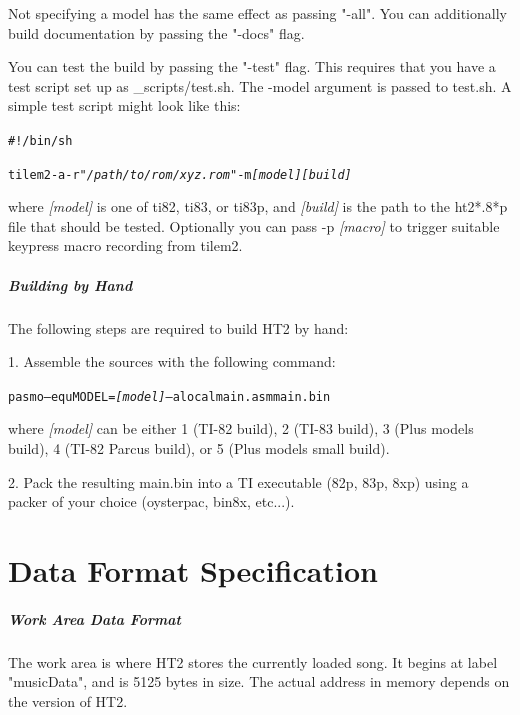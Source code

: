 \documentclass[12pt]{report}	%
\begin{document}
\begin{appendices}
Not specifying a model has the same effect as passing "-all". You can additionally build documentation by passing the "-docs" flag.

You can test the build by passing the "-test" flag. This requires that you have a test script set up as \_scripts/test.sh. The -model argument is passed to test.sh. A simple test script might look like this:

\begin{alltt}
#!/bin/sh

tilem2 -a -r "\emph{/path/to/rom/xyz.rom}" -m \emph{[model] [build]}
\end{alltt}

where \emph{[model]} is one of ti82, ti83, or ti83p, and \emph{[build]} is the path to the ht2*.8*p file that should be tested. Optionally you can pass -p\emph{ [macro]} to trigger suitable keypress macro recording from tilem2.

\paragraph{Building by Hand} The following steps are required to build HT2 by hand: 

1. Assemble the sources with the following command:

\begin{alltt}
pasmo --equ MODEL=\emph{[model]} --alocal main.asm main.bin
\end{alltt}

where \emph{[model]} can be either 1 (TI-82 build), 2 (TI-83 build), 3 (Plus models build), 4 (TI-82 Parcus build), or 5 (Plus models small build).

2. Pack the resulting main.bin into a TI executable (82p, 83p, 8xp) using a packer of your choice (oysterpac, bin8x, etc...).



\chapter{Data Format Specification}

\paragraph{Work Area Data Format} The work area is where HT2 stores the currently loaded song. It begins at label "musicData", and is 5125 bytes in size. The actual address in memory depends on the version of HT2. \newline


\end{appendices}
\end{document}
